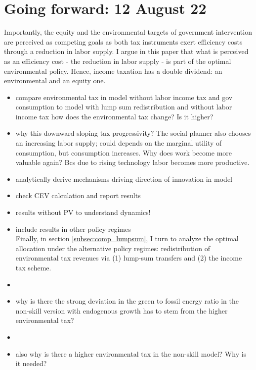 
\section{Going forward: 12 August 22}

Importantly, the equity and the environmental targets of government intervention are perceived as competing goals as both tax instruments exert efficiency costs through a reduction in labor supply.
I argue in this paper that what is perceived as an efficiency cost -  the reduction in labor supply - is part of the optimal environmental policy. Hence, income taxation has a double dividend: an environmental and an equity one.   




\begin{itemize}
	\item compare environmental tax in model without labor income tax and gov consumption to model with lump sum redistribution and without labor income tax \ar how does the environmental tax change? Is it higher?
	\item why this downward sloping tax progressivity? The social planner also chooses an increasing labor supply; could depends on the marginal utility of consumption, but consumption increases. Why does work become more valuable again? 
	Bcs due to rising technology labor becomes more productive. 
	\item analytically derive mechanisms driving direction of innovation in model
	\item check CEV calculation and report results
	\item results without PV to understand dynamics!
	\item include results in other policy regimes\\
	Finally, in section \ref{subsec:comp_lumpsum}, I turn to analyze the optimal allocation under the alternative policy regimes: redistribution of environmental tax revenues via (1) lump-sum transfers and (2) the income tax scheme. 
	\item {}
	\item why is there the strong deviation in the green to fossil energy ratio in the non-skill version with endogenous growth \ar has to stem from the higher environmental tax? \checkmark 
	\item {}
	\item also why is there a higher environmental tax in the non-skill model? Why is it needed? \checkmark
\end{itemize}
